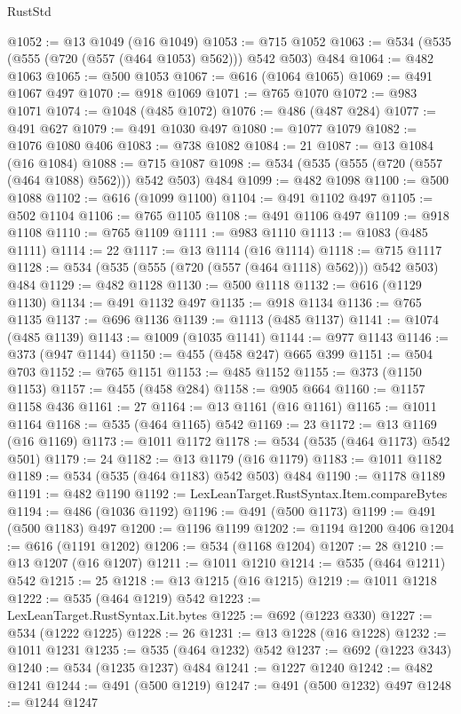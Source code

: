 \begin{lexlean}{RustStd}
\begin{coremodule}
@1052 := @13 @1049 (@16 @1049)
@1053 := @715 @1052
@1063 := @534 (@535 (@555 (@720 (@557 (@464 @1053) @562))) @542 @503) @484
@1064 := @482 @1063
@1065 := @500 @1053
@1067 := @616 (@1064 @1065)
@1069 := @491 @1067 @497
@1070 := @918 @1069
@1071 := @765 @1070
@1072 := @983 @1071
@1074 := @1048 (@485 @1072)
@1076 := @486 (@487 @284)
@1077 := @491 @627
@1079 := @491 @1030 @497
@1080 := @1077 @1079
@1082 := @1076 @1080 @406
@1083 := @738 @1082
@1084 := 21
@1087 := @13 @1084 (@16 @1084)
@1088 := @715 @1087
@1098 := @534 (@535 (@555 (@720 (@557 (@464 @1088) @562))) @542 @503) @484
@1099 := @482 @1098
@1100 := @500 @1088
@1102 := @616 (@1099 @1100)
@1104 := @491 @1102 @497
@1105 := @502 @1104
@1106 := @765 @1105
@1108 := @491 @1106 @497
@1109 := @918 @1108
@1110 := @765 @1109
@1111 := @983 @1110
@1113 := @1083 (@485 @1111)
@1114 := 22
@1117 := @13 @1114 (@16 @1114)
@1118 := @715 @1117
@1128 := @534 (@535 (@555 (@720 (@557 (@464 @1118) @562))) @542 @503) @484
@1129 := @482 @1128
@1130 := @500 @1118
@1132 := @616 (@1129 @1130)
@1134 := @491 @1132 @497
@1135 := @918 @1134
@1136 := @765 @1135
@1137 := @696 @1136
@1139 := @1113 (@485 @1137)
@1141 := @1074 (@485 @1139)
@1143 := @1009 (@1035 @1141)
@1144 := @977 @1143
@1146 := @373 (@947 @1144)
@1150 := @455 (@458 @247) @665 @399
@1151 := @504 @703
@1152 := @765 @1151
@1153 := @485 @1152
@1155 := @373 (@1150 @1153)
@1157 := @455 (@458 @284)
@1158 := @905 @664
@1160 := @1157 @1158 @436
@1161 := 27
@1164 := @13 @1161 (@16 @1161)
@1165 := @1011 @1164
@1168 := @535 (@464 @1165) @542
@1169 := 23
@1172 := @13 @1169 (@16 @1169)
@1173 := @1011 @1172
@1178 := @534 (@535 (@464 @1173) @542 @501)
@1179 := 24
@1182 := @13 @1179 (@16 @1179)
@1183 := @1011 @1182
@1189 := @534 (@535 (@464 @1183) @542 @503) @484
@1190 := @1178 @1189
@1191 := @482 @1190
@1192 := LexLeanTarget.RustSyntax.Item.compareBytes
@1194 := @486 (@1036 @1192)
@1196 := @491 (@500 @1173)
@1199 := @491 (@500 @1183) @497
@1200 := @1196 @1199
@1202 := @1194 @1200 @406
@1204 := @616 (@1191 @1202)
@1206 := @534 (@1168 @1204)
@1207 := 28
@1210 := @13 @1207 (@16 @1207)
@1211 := @1011 @1210
@1214 := @535 (@464 @1211) @542
@1215 := 25
@1218 := @13 @1215 (@16 @1215)
@1219 := @1011 @1218
@1222 := @535 (@464 @1219) @542
@1223 := LexLeanTarget.RustSyntax.Lit.bytes
@1225 := @692 (@1223 @330)
@1227 := @534 (@1222 @1225)
@1228 := 26
@1231 := @13 @1228 (@16 @1228)
@1232 := @1011 @1231
@1235 := @535 (@464 @1232) @542
@1237 := @692 (@1223 @343)
@1240 := @534 (@1235 @1237) @484
@1241 := @1227 @1240
@1242 := @482 @1241
@1244 := @491 (@500 @1219)
@1247 := @491 (@500 @1232) @497
@1248 := @1244 @1247

\end{coremodule}
\end{lexlean}
